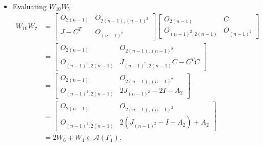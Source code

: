 \begin{itemize}
    \item Evaluating $W_{10}W_7$
    \begin{align*}
        W_{10}W_7
        &=\begin{bmatrix}
            O_{2(n-1)} & O_{2(n-1), (n-1)^2} \\
            J-C^T & O_{(n-1)^2}
        \end{bmatrix}\begin{bmatrix}
            O_{2(n-1)} &C \\
            O_{(n-1)^2, 2(n-1)} & O_{(n-1)^2}
        \end{bmatrix}\\
        &= \begin{bmatrix}
            O_{2(n-1)} & O_{2(n-1), (n-1)^2} \\
            O_{(n-1)^2, 2(n-1)} & J_{(n-1)^2,2(n-1)}C - C^TC
        \end{bmatrix}\\
        &= \begin{bmatrix}
            O_{2(n-1)} & O_{2(n-1), (n-1)^2} \\
            O_{(n-1)^2, 2(n-1)} & 2J_{(n-1)^2} - 2I - A_2
        \end{bmatrix}\\
        &= \begin{bmatrix}
            O_{2(n-1)} & O_{2(n-1), (n-1)^2} \\
            O_{(n-1)^2, 2(n-1)} & 2(J_{(n-1)^2} - I - A_2) + A_2
        \end{bmatrix}\\
        &= 2W_{6} + W_4\in\mathcal{A}(\Gamma_1).
    \end{align*}
    

\end{itemize}
